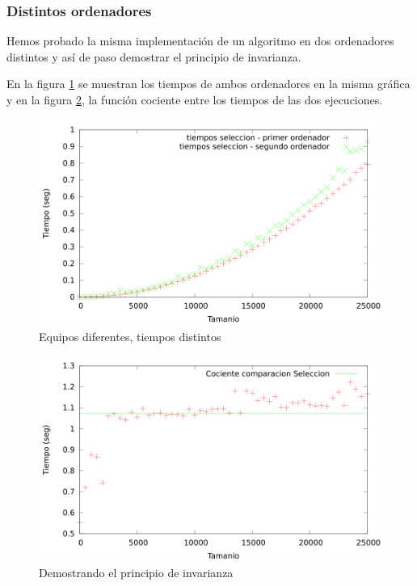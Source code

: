 \documentclass{article}
\begin{document}
\subsubsection{Distintos ordenadores}
Hemos probado la misma implementación de un algoritmo en dos ordenadores distintos y así de paso demostrar el principio de invarianza.
\

En la figura \ref{fig:compSeleccion} se muestran los tiempos de ambos ordenadores en la misma gráfica y en la figura \ref{fig:compSeleccion_cociente}, la función cociente entre los tiempos de las dos ejecuciones.
\begin{figure}[H]
	\centering
	\includegraphics[totalheight=8cm]{img/compSeleccion}
	\caption{Equipos diferentes, tiempos distintos}
	\label{fig:compSeleccion}
\end{figure}
\begin{figure}[H]
	\centering
	\includegraphics[totalheight=8cm]{img/compSeleccion_cociente}
	\caption{Demostrando el principio de invarianza}
	\label{fig:compSeleccion_cociente}
\end{figure}
\end{document}
